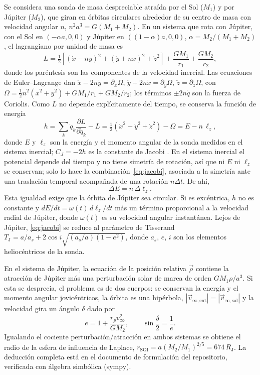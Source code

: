 \documentclass[11pt,letterpaper]{article}
\newcommand{\RJ}{R_{\mathrm J}}
\newcommand{\vinf}{v_\infty}
\newcommand{\rsoi}{r_{\mathrm{SOI}}}
\begin{document}
Se considera una sonda de masa despreciable atraída por el Sol ($M_1$) y por Júpiter ($M_2$),
que giran en órbitas circulares alrededor de su centro de masa con velocidad angular $n$,
$n^2a^3 = G(M_1+M_2)$. En un sistema que rota con Júpiter, con el Sol en $(-\alpha a,0,0)$ y
Júpiter en $((1-\alpha)a,0,0)$, $\alpha = M_2/(M_1+M_2)$, el lagrangiano por unidad de masa es
\begin{equation}
L = \tfrac12\left[(\dot x - ny)^2 + (\dot y + nx)^2 + \dot z^2\right] + \frac{GM_1}{r_1} + \frac{GM_2}{r_2},
\end{equation}
donde los paréntesis son las componentes de la velocidad inercial. Las ecuaciones de
Euler--Lagrange dan $\ddot x - 2n\dot y = \partial_x\Omega$, $\ddot y + 2n\dot x = \partial_y\Omega$,
$\ddot z = \partial_z\Omega$, con $\Omega = \tfrac12 n^2(x^2+y^2) + GM_1/r_1 + GM_2/r_2$; los
términos $\pm 2n\dot q$ son la fuerza de Coriolis. Como $L$ no depende explícitamente del
tiempo, se conserva la función de energía \cite{goldstein2002}
\begin{equation}
h = \sum_k \dot q_k\frac{\partial L}{\partial\dot q_k} - L
  = \tfrac12\left(\dot x^2+\dot y^2+\dot z^2\right) - \Omega = E - n\,\ell_z ,
\label{eq:jacobi}
\end{equation}
donde $E$ y $\ell_z$ son la energía y el momento angular de la sonda medidos en el sistema
inercial; $C_J = -2h$ es la constante de Jacobi \cite{murray1999}. En el sistema inercial el
potencial depende del tiempo y no tiene simetría de rotación, así que ni $E$ ni $\ell_z$ se
conservan; solo lo hace la combinación~\eqref{eq:jacobi}, asociada a la simetría ante una
traslación temporal acompañada de una rotación $n\Delta t$. De ahí,
\begin{equation}
\Delta E = n\,\Delta\ell_z .
\label{eq:DE}
\end{equation}
Esta igualdad exige que la órbita de Júpiter sea circular. Si es excéntrica, $h$ no es
constante y $dE/dt = \omega(t)\,d\ell_z/dt$ más un término proporcional a la velocidad radial de
Júpiter, donde $\omega(t)$ es su velocidad angular instantánea. Lejos de Júpiter,
\eqref{eq:jacobi} se reduce al parámetro de Tisserand
$T_{\mathrm J} = a/a_s + 2\cos i\sqrt{(a_s/a)(1-e^2)}$, donde $a_s$, $e$, $i$ son los elementos
heliocéntricos de la sonda.

En el sistema de Júpiter, la ecuación de la posición relativa $\vec\rho$ contiene la atracción
de Júpiter más una perturbación solar de marea de orden $GM_1\rho/a^3$. Si esta se desprecia, el
problema es de dos cuerpos: se conservan la energía y el momento angular jovicéntricos, la
órbita es una hipérbola, $|\vec v_{\infty,\mathrm{ent}}| = |\vec v_{\infty,\mathrm{sal}}|$ y la
velocidad gira un ángulo $\delta$ dado por
\begin{equation}
e = 1 + \frac{r_p\vinf^2}{GM_2}, \qquad \sin\frac{\delta}{2} = \frac1e .
\label{eq:giro}
\end{equation}
Igualando el cociente perturbación/atracción en ambos sistemas se obtiene el radio de la
esfera de influencia de Laplace, $\rsoi = a(M_2/M_1)^{2/5} = 674\,\RJ$. La deducción completa
está en el documento de formulación del repositorio, verificada con álgebra simbólica (sympy).
\end{document}
